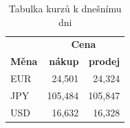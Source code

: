 \documentclass[11pt,a4paper,titlepage]{article}
\begin{document}
		\begin{table}[h]
			\begin{center}
				\begin{tabular}{|l|r|r|} \hline
							& \multicolumn{2}{|c|}{\textbf{Cena}} \\ \cline{2-3}
					\textbf{Měna} & 	\textbf{nákup} & \textbf{prodej}  \\ \hline 
						EUR & 24,501 & 24,324 \\
						JPY & 105,484 & 105,847 \\
						USD &  16,632 & 16,328 \\ \hline
				\end{tabular}

				\caption{Tabulka kurzů k dnešnímu dni}
				\label{tabulka1}
			\end{center}
		\end{table}
\end{document}
